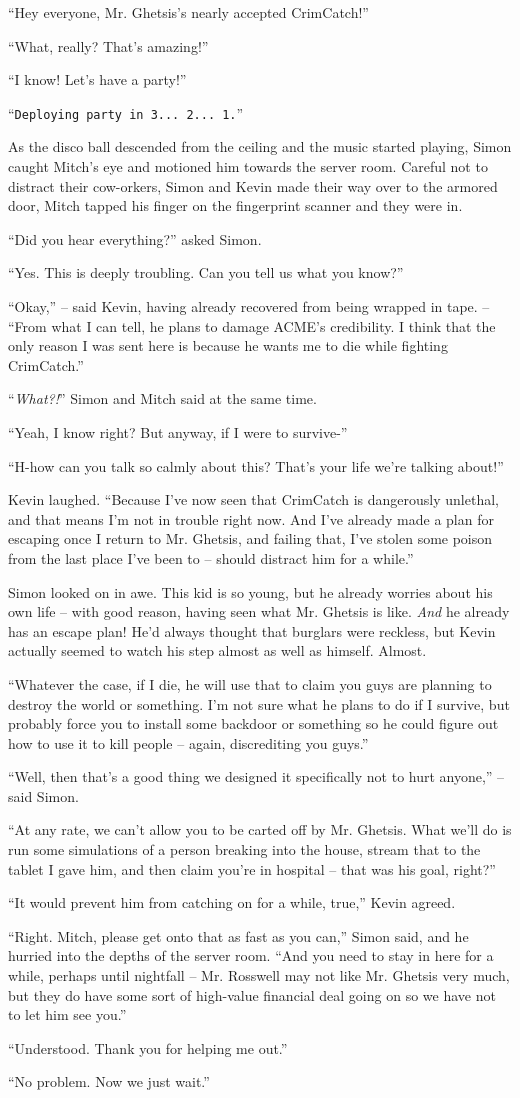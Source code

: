 \documentclass[10pt,a4paper]{article}
\newcommand{\lang}[2]{ #2 \par}
\newcommand{\ai}[2]{
	\lang{
		-- \texttt{#1}
	}{
		``\texttt{#2}''
	}
}
\newcommand{\mainname}{Simon}
\newcommand{\auxname}{Mitch}
\newcommand{\corpnameshort}{ACME}
\newcommand{\ceoname}{Mr. Rosswell}
\newcommand{\policename}{Mr. Ghetsis}
\newcommand{\featurename}{CrimCatch}
\newcommand{\criminalname}{Kevin}
\begin{document}
\lang{...}{``Hey everyone, \policename{}'s nearly accepted \featurename{}!''}
\lang{...}{``What, really? That's amazing!''}
\lang{...}{``I know! Let's have a party!''}
\ai{...}{Deploying party in 3... 2... 1.}
\lang{...}{As the disco ball descended from the ceiling and the music started playing, \mainname{} caught \auxname{}'s eye and motioned him towards the server room. Careful not to distract their cow-orkers, \mainname{} and \criminalname{} made their way over to the armored door, \auxname{} tapped his finger on the fingerprint scanner and they were in.}
\lang{...}{``Did you hear everything?'' asked \mainname{}.}
\lang{...}{``Yes. This is deeply troubling. Can you tell us what you know?''}
\lang{...}{``Okay,'' -- said \criminalname{}, having already recovered from being wrapped in tape. -- ``From what I can tell, he plans to damage \corpnameshort{}'s credibility. I think that the only reason I was sent here is because he wants me to die while fighting \featurename{}.''}
\lang{...}{``\emph{What?!}'' \mainname{} and \auxname{} said at the same time.}
\lang{...}{``Yeah, I know right? But anyway, if I were to survive-''}
\lang{...}{``H-how can you talk so calmly about this? That's your life we're talking about!''}
\lang{...}{\criminalname{} laughed. ``Because I've now seen that \featurename{} is dangerously unlethal, and that means I'm not in trouble right now. And I've already made a plan for escaping once I return to \policename{}, and failing that, I've stolen some poison from the last place I've been to -- should distract him for a while.''}
\lang{...}{\mainname{} looked on in awe. This kid is so young, but he already worries about his own life -- with good reason, having seen what \policename{} is like. \emph{And} he already has an escape plan! He'd always thought that burglars were reckless, but \criminalname{} actually seemed to watch his step almost as well as himself. Almost.}
\lang{...}{``Whatever the case, if I die, he will use that to claim you guys are planning to destroy the world or something. I'm not sure what he plans to do if I survive, but probably force you to install some backdoor or something so he could figure out how to use it to kill people -- again, discrediting you guys.''}
\lang{...}{``Well, then that's a good thing we designed it specifically not to hurt anyone,'' -- said \mainname{}.}
\lang{...}{``At any rate, we can't allow you to be carted off by \policename{}. What we'll do is run some simulations of a person breaking into the house, stream that to the tablet I gave him, and then claim you're in hospital -- that was his goal, right?''}
\lang{...}{``It would prevent him from catching on for a while, true,'' \criminalname{} agreed.}
\lang{...}{``Right. \auxname{}, please get onto that as fast as you can,'' \mainname{} said, and he hurried into the depths of the server room. ``And you need to stay in here for a while, perhaps until nightfall -- \ceoname{} may not like \policename{} very much, but they do have some sort of high-value financial deal going on so we have not to let him see you.''}
\lang{...}{``Understood. Thank you for helping me out.''}
\lang{...}{``No problem. Now we just wait.''}
\end{document}

